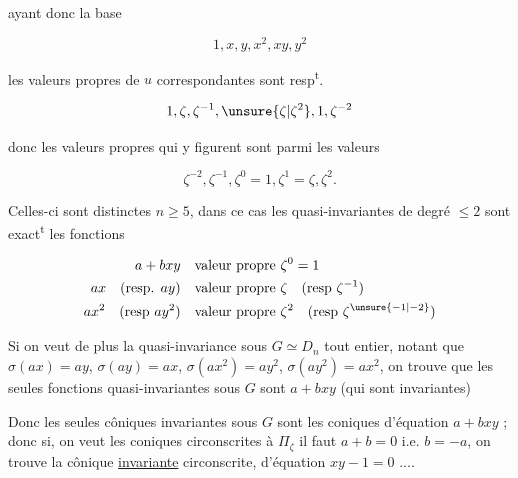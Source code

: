 
ayant donc la base

\[1,x,y,x^2,xy,y^2\]

les valeurs propres de $u$ correspondantes sont resp\textsuperscript{t}.

\[1,\zeta,\zeta^{-1},\unsure{\zeta|\zeta^2},1,\zeta^{-2}\]

donc les valeurs propres qui y figurent sont  parmi les  valeurs

\[\zeta^{-2},\zeta^{-1},\zeta^0=1,\zeta^1=\zeta,\zeta^2.\]

Celles-ci sont  distinctes  $n\geq5$, dans ce cas les  quasi-invariantes de degré $\leq2$  sont exact\textsuperscript{t} les fonctions

\[\begin{aligned}
a+bxy&&\text{valeur propre }&\zeta^0=1\\
ax\quad(\text{resp. }ay)&&\text{valeur propre }&\zeta\quad(\text{resp }\zeta^{-1})\\
ax^2\quad(\text{resp }ay^2)&&\text{valeur propre }&\zeta^2\quad(\text{resp }\zeta^{\unsure{-1|-2}})
\end{aligned}\]

Si on veut de plus la quasi-invariance sous $G\simeq D_n$ tout entier,  notant que $\sigma(ax)=ay$, $\sigma(ay)=ax$, $\sigma(ax^2)=ay^{2}$, $\sigma(ay^2)=ax^2$, on trouve que les seules fonctions  quasi-invariantes sous $G$ sont  $a+bxy$ (qui sont  invariantes)

Donc les seules côniques invariantes sous $G$ sont les coniques d'équation $a+bxy$ ; donc si, on veut les coniques circonscrites à $\Pi_\zeta$ il faut $a+b=0$ i.e. $b=-a$, on trouve la  cônique \uline{invariante} circonscrite, d'équation $xy-1=0$ ....

